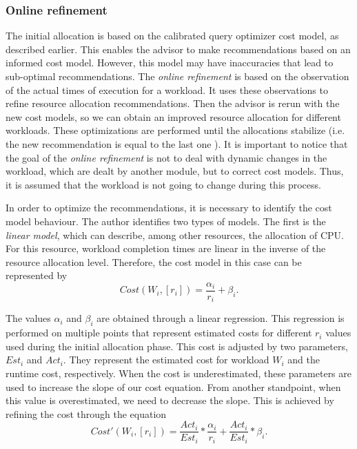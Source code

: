 \documentclass[jidm,a4paper]{jidm} %
\begin{document}



\subsubsection{Online refinement}
\label{subsec:ref}

The initial allocation is based on the calibrated query optimizer cost model, as described earlier. This enables the advisor to make recommendations based on an informed cost model. However, this model may have inaccuracies that lead to sub-optimal recommendations. The  \textit{online refinement} is based on the observation of the actual times of execution for a workload. It uses these observations to refine resource allocation recommendations. Then the advisor is rerun with the new cost models, so  we can obtain an improved resource allocation for different workloads. These optimizations are performed until the allocations stabilize (i.e. the new recommendation is equal to the last one ). It is important to notice that the goal of the \textit{online refinement} is not to deal with dynamic changes in the workload, which are dealt by another module, but to correct cost models. Thus, it is assumed that the workload is not going to change during this process. 

In order to optimize the recommendations, it is necessary to identify the cost model behaviour. The author identifies two types of models. The first is the \textit{linear model}, which can describe, among other resources, the allocation of CPU. For this resource, workload completion times are linear in the inverse of the resource allocation level. Therefore, the cost model in this case can be represented by
\[
 Cost(W_{i}, [r_{i}]) = \frac{\alpha_{i}}{r_{i}} +\beta_{i}.
\]

The values $\alpha_{i}$ and $\beta_{i}$ are obtained through a linear regression. This regression is performed on multiple points that represent estimated costs for different $r_{i}$ values used during the initial allocation phase. This cost is adjusted by two parameters, $Est_{i}$ and $Act_{i}$. They represent the estimated cost for workload $W_{i}$ and the runtime cost, respectively. When the cost is underestimated, these parameters are used to increase the slope of our cost equation. From another standpoint, when this value is overestimated, we need to decrease the slope. This is achieved by refining the cost through the equation
\[
  Cost'(W_{i}, [r_{i}]) = \frac{Act_{i}}{Est_{i}} * \frac{\alpha_{i}}{r_{i}} + \frac{Act_{i}}{Est_{i}} * \beta_{i}.
\]
\end{document}

